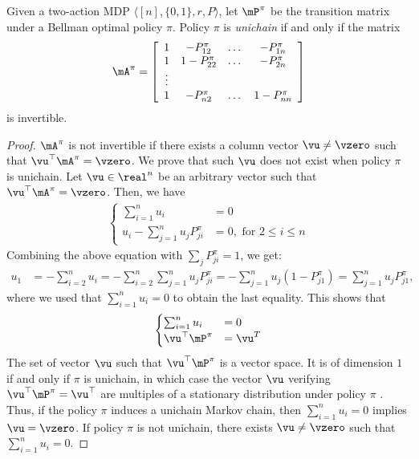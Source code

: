 \begin{lem}
\label{lem:invertible}
Given a two-action MDP $\langle [n], \{0,1\}, r, P\rangle$, let $\mP^\pi$ be the transition matrix under a Bellman optimal policy $\pi$.
Policy $\pi$ is \emph{unichain} if and only if the matrix
\begin{align*}
    \mA^{\pi}
        = \left[\begin{array}{ccccc}
                1 & - P_{12}^{\pi} & \dots & -P_{1n}^{\pi}\\
                1 & 1-P_{22}^{\pi} & \dots & -P_{2n}^{\pi}\\
                \vdots\\
                1 &  -P_{n2}^{\pi} & \dots &1-P_{nn}^{\pi}
    \end{array}\right]
\end{align*}
is invertible.
\end{lem}
\begin{proof}
    $\mA^\pi$ is not invertible if there exists a column vector $\vu\neq\vzero$ such that $\vu^\top \mA^\pi=\vzero$.
    We prove that such $\vu$ does not exist when policy $\pi$ is unichain.
    Let $\vu\in\real^n$ be an arbitrary vector such that $\vu^\top \mA^\pi=\vzero$.
    Then, we have
    \begin{align*}
        \begin{cases}
            \sum_{i=1}^{n}u_i &= 0 \\
            u_i-\sum_{j=1}^{n}u_jP_{ji}^\pi &= 0, \text{ for } 2\le i\le n
        \end{cases}
    \end{align*}
    Combining the above equation with $\sum_j P^\pi_{ji}=1$, we get:
    \begin{align*}
        u_1 &= -\sum_{i=2}^n u_i
        =-\sum_{i=2}^n\sum_{j=1}^n u_j P^\pi_{ji}
        =-\sum_{j=1}^n u_j (1-P^\pi_{j1})
        = \sum_{j=1}^n u_j P^\pi_{j1},
    \end{align*}
    where we used that $\sum_{i=1}^{n}u_i=0$ to obtain the last equality.  
    This shows that 
    \begin{align*}
        \begin{cases}
            \sum_{i=1}^{n}u_i &= 0 \\
            \vu^\top\mP^\pi &=\vu^T
        \end{cases}
    \end{align*}
    The set of vector $\vu$ such that $\vu^\top\mP^\pi$ is a vector space. It is of dimension $1$ if and only if $\pi$ is unichain, in which case the vector $\vu$ verifying $\vu^\top\mP^\pi=\vu^\top$ are multiples of a stationary distribution under policy $\pi$ \cite{puterman2014markov}. Thus, if the policy $\pi$ induces a unichain Markov chain, then $\sum_{i=1}^{n}u_i = 0$ implies $\vu = \vzero$. If policy $\pi$ is not unichain, there exists $\vu\ne\vzero$ such that $\sum_{i=1}^{n}u_i = 0$.
\end{proof}

